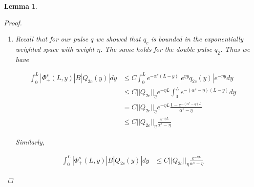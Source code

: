 \documentclass[12pt]{article}
\newtheorem{lemma}{Lemma}
\begin{document}
\begin{lemma}
\begin{proof}
\begin{enumerate}
Similarly,

\begin{align*}
\int_{-L}^0 |\Phi^u_-(-L, y)||(K_2^+ B W_1^+)(y)| dy &\leq C \int_{-L}^0 e^{-\alpha^u(L+y)}\int_{-L}^y|w_2^-(z)|dz dy \\
&= C \int_{-L}^0 e^{-\alpha^u(L+y)}\int_{-L}^y|e^{-\eta z} w_2^-(z)|e^{\eta z} dz dy \\
&\leq C e^{-\eta L} ||W_2^-||_\eta \int_{-L}^0 e^{-\alpha^u(L+y)}\int_{-L}^y e^{\eta(L+z)} dz dy \\
&= C e^{-\eta L} ||W_2^-||_\eta \int_{-L}^0 e^{-\alpha^u(L+y)} \frac{e^{\eta(L + y)} - 1}{\eta} dy \\
&\leq C \frac{e^{-\eta L}}{\eta} ||W_2^-||_\eta \int_{-L}^0 e^{-(\alpha^u - \eta)(L+y)} dy \\
&= C \frac{e^{-\eta L}}{\eta} ||W_2^-||_\eta \frac{1 - e^{-(\alpha^u - \eta)L}}{\alpha^u - \eta} \\
&= C \frac{e^{-\eta L}}{\eta(\alpha^u - \eta)} ||W_2^-||_\eta
\end{align*}

Combining these, we have

\begin{align*}
\int_0^L &|\Phi^s_+(L, y)||(K_1^+ B W_1^+)(y)| dy + \int_{-L}^0 |\Phi^u_-(-L, y)||(K_2^+ B W_1^+)(y)| dy \\
& \leq C \left( \frac{1}{\alpha^s - \eta} + \frac{1}{\alpha^u - \eta} \right) \frac{e^{-\eta L}}{\eta} ||W||_\eta
\end{align*}

\item Recall that for our pulse $q$ we showed that $q_{c}$ is bounded in the exponentially weighted space with weight $\eta$. The same holds for the double pulse $q_2$. Thus we have

\begin{align*}
\int_0^L |\Phi^s_+(L, y)| B |Q_{2c}(y)| dy &\leq C \int_0^L e^{-\alpha^s(L-y)}|e^{\eta y} q_{2c}(y)|e^{-\eta y} dy\\
& \leq C ||Q_{2c}||_\eta e^{-\eta L} \int_0^L e^{-(\alpha^s - \eta)(L-y)}dy \\
&= C ||Q_{2c}||_\eta e^{-\eta L}\frac{1 - e^{-(\alpha^s - \eta)L}}{\alpha^s - \eta} \\
&\leq C ||Q_{2c}||_\eta\frac{ e^{-\eta L}}{\alpha^s - \eta} 
\end{align*}

Similarly,

\begin{align*}
\int_0^L |\Phi^s_+(L, y)| B |Q_{2c}(y)| dy&\leq C ||Q_{2c}||_\eta\frac{ e^{-\eta L}}{\alpha^u - \eta} 
\end{align*}


\end{enumerate}
\end{proof}
\end{lemma}
\end{document}
